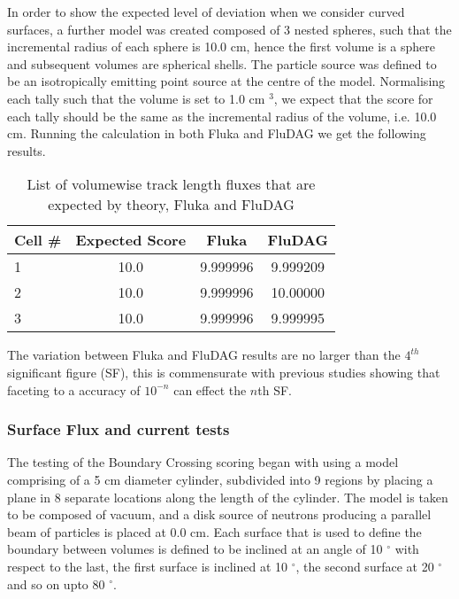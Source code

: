 \documentclass{anstrans}
\begin{document}
In order to show the expected level of deviation when we consider
curved surfaces, a further model was created composed of 3 nested
spheres, such that the incremental radius of each sphere is 10.0 cm,
hence the first volume is a sphere and subsequent volumes are
spherical shells. The particle source was defined to be an
isotropically emitting point source at the centre of the
model. Normalising each tally such that the volume is set to 1.0 cm $^3$, 
we expect that the score for each tally should be the same as the
incremental radius of the volume, i.e. 10.0 cm. Running the calculation
in both Fluka and FluDAG we get the following results.
\begin{table}[h!]
	\begin{center}
		\begin{tabular}{|l|c|c|c|}
			\hline
			Cell \# & Expected Score & Fluka  & FluDAG \\
			\hline
			1 & 10.0 & 9.999996 & 9.999209 \\
			2 & 10.0 & 9.999996 & 10.00000 \\
			3 & 10.0 & 9.999996 & 9.999995 \\
			\hline
		\end{tabular}
		\caption{List of volumewise track length fluxes that are 
			expected by theory, Fluka and FluDAG}
	\end{center}
\label{usrtrack_comp_sphere}
\end{table}
The variation between Fluka and FluDAG results are no larger than the
$4^{th}$ significant figure (SF), this is commensurate with previous
studies \cite{snouffer_ans} showing that faceting to a accuracy of $10^{-n}$ can
effect the $n$th SF. 

\subsubsection*{Surface Flux and current tests}
The testing of the Boundary Crossing scoring began with using a model
comprising of a 5 cm diameter cylinder, subdivided into 9 regions by
placing a plane in 8 separate locations along the length of the
cylinder. The model is taken to be composed of vacuum, and a disk
source of neutrons producing a parallel beam of particles is placed at
0.0 cm. Each surface that is used to define the boundary between
volumes is defined to be inclined at an angle of 10 $^{\circ}$ with respect to the
last, the first surface is inclined at 10 $^{\circ}$, the second
surface at 20 $^{\circ}$ and so on upto 80 $^{\circ}$.
\end{document}
